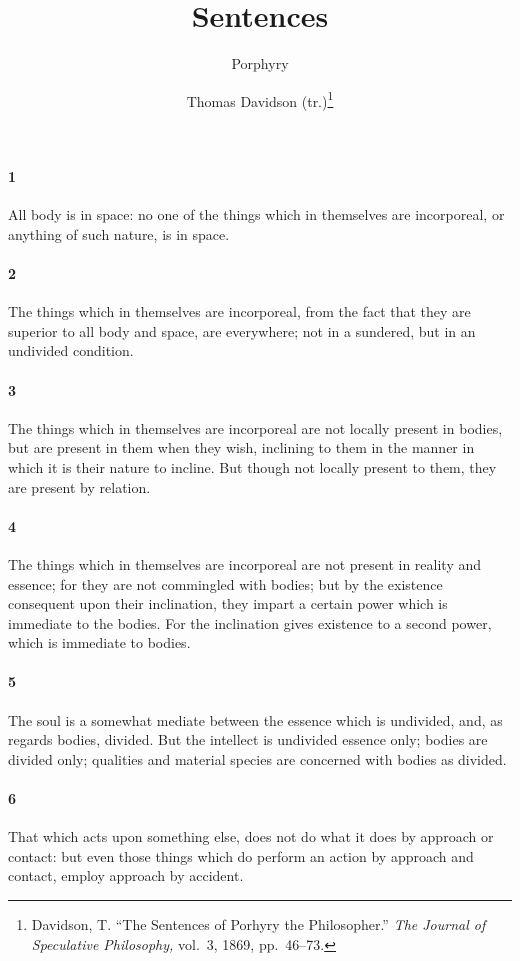 \documentclass[12pt]{article}
\title{Sentences}
\author{Porphyry \and Thomas Davidson (tr.)\footnote{Davidson, T. ``The
Sentences of Porhyry the Philosopher.'' \textit{The Journal of Speculative
Philosophy,} vol.~3, 1869, pp.~46--73.}}
\date{}
\begin{document}
\maketitle

\paragraph{1} All body is in space: no one of the things which in themselves
are incorporeal, or anything of such nature, is in space.

\paragraph{2} The things which in themselves are incorporeal, from the fact
that they are superior to all body and space, are everywhere; not in a
sundered, but in an undivided condition.

\paragraph{3} The things which in themselves are incorporeal are not locally
present in bodies, but are present in them when they wish, inclining to them in
the manner in which it is their nature to incline. But though not locally
present to them, they are present by relation.

\paragraph{4} The things which in themselves are incorporeal are not present in
reality and essence; for they are not commingled with bodies; but by the
existence consequent upon their inclination, they impart a certain power which
is immediate to the bodies. For the inclination gives existence to a second
power, which is immediate to bodies.

\paragraph{5} The soul is a somewhat mediate between the essence which is
undivided, and, as regards bodies, divided. But the intellect is undivided
essence only; bodies are divided only; qualities and material species are
concerned with bodies as divided.

\paragraph{6} That which acts upon something else, does not do what it does by
approach or contact: but even those things which do perform an action by
approach and contact, employ approach by accident.
\end{document}
